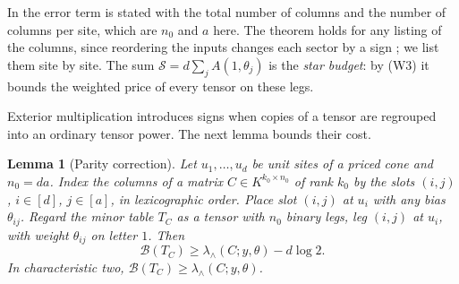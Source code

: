\documentclass[11pt]{article}
\newtheorem{lemma}[theorem]{Lemma}
\theoremstyle{remark}
\newcommand{\price}{\mathcal B}
\newcommand{\cS}{\mathcal S}
\newcommand{\lamext}{\lambda_\wedge}
\begin{document}
In \cite{hc} the error term is stated with the total number of columns
and the number of columns per site, which are \(n_0\) and \(a\) here.
The theorem holds for any listing of the columns, since reordering the
inputs changes each sector by a sign \cite[Section 8.1]{hc}; we list them
site by site. The sum
\(\cS=d\sum_jA(1,\theta_j)\) is the \emph{star budget}: by (W3) it bounds
the weighted price of every tensor on these legs.

Exterior multiplication introduces signs when copies of a tensor are
regrouped into an ordinary tensor power. The next lemma bounds their
cost.

\begin{lemma}[Parity correction]\label{lem:sign}
Let \(u_1,\ldots,u_d\) be unit sites of a priced cone and \(n_0=da\).
Index the columns of a matrix \(C\in K^{k_0\times n_0}\) of rank \(k_0\)
by the slots \((i,j)\), \(i\in[d]\), \(j\in[a]\), in lexicographic order.
Place slot \((i,j)\) at \(u_i\) with any bias \(\theta_{ij}\). Regard the
minor table \(T_C\) as a tensor with \(n_0\) binary legs, leg \((i,j)\)
at \(u_i\), with weight \(\theta_{ij}\) on letter \(1\). Then
\[
 \price(T_C)\ge\lamext(C;y,\theta)-d\log2 .
\]
In characteristic two, \(\price(T_C)\ge\lamext(C;y,\theta)\).
\end{lemma}
\end{document}
